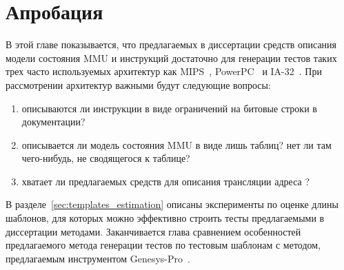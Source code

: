 \chapter{Апробация}

В этой главе показывается, что предлагаемых в диссертации средств
описания модели состояния MMU и инструкций достаточно для генерации
тестов таких трех часто используемых архитектур как MIPS~\cite{mips64_II},
PowerPC~\cite{PowerPC} и IA-32~\cite{IA32}. При
рассмотрении архитектур важными будут следующие вопросы:
\begin{enumerate}
    \item описываются ли инструкции в виде ограничений на битовые
    строки в документации?
    \item описывается ли модель состояния MMU в виде лишь таблиц? нет ли там
чего-нибудь, не сводящегося к таблице?
    \item хватает ли предлагаемых средств для описания трансляции адреса ?
\end{enumerate}

В разделе~\ref{sec:templates_estimation} описаны эксперименты по оценке длины шаблонов, для
которых можно эффективно строить тесты предлагаемыми в диссертации
методами. Заканчивается глава
сравнением особенностей предлагаемого метода генерации тестов по
тестовым шаблонам с методом, предлагаемым инструментом
Genesys-Pro~\cite{GenesysPro}.





